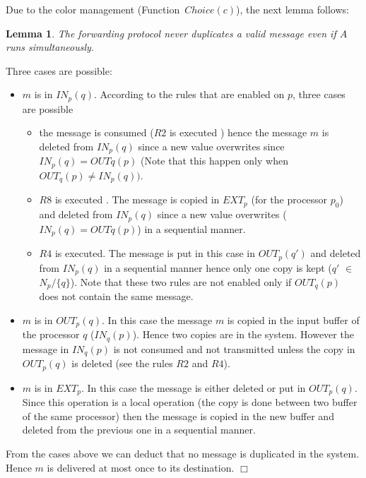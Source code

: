 \documentclass{llncs}
\renewenvironment{proof}{{\it Proof. } }{{\hfill $\Box$}\vspace{.5pc}}
\newtheorem{lem}{Lemma}
\begin{document}
Due to the color management (Function~$Choice(c)$), the next lemma follows:

\begin{lem}\label{lem:duplicate}
The forwarding protocol never duplicates a valid message even if $A$ runs simultaneously.
\end{lem}

\begin{proof}
Three cases are possible:
\begin{itemize}
\item{$m$ is in $IN_{p}(q)$. According to the rules that are enabled on $p$, three cases are possible \\ } 
\begin{itemize}
\item{the message is consumed ($R2$ is executed ) hence the message $m$ is deleted from $IN_{p}(q)$ since a new value overwrites since $IN_{p}(q)=OUT{q}(p)$ (Note that this happen only when $OUT_{q}(p)\ne IN_{p}(q))$.}
\item{$R8$ is executed . The message is copied in $EXT_{p}$ (for the processor $p_0$) and deleted from $IN_{p}(q)$ since a new value overwrites ($IN_{p}(q)=OUT{q}(p)$) in a sequential manner.}
\item{$R4$ is executed. The message is put in this case in $OUT_{p}(q')$ and deleted from $IN_{p}(q)$ in a sequential manner hence only one copy is kept ($q'$ $\in$ $N_{p}/\{q\}$). Note that these two rules are not enabled only if $OUT_{q}(p)$ does not contain the same message.}
\end{itemize}
\item{$m$ is in $OUT_{p}(q)$. In this case the message $m$ is copied in the input buffer of the processor $q$ ($IN_{q}(p)$). Hence two copies are in the system. However the message in $IN_{q}(p)$ is not consumed and not transmitted unless the copy in $OUT_{p}(q)$ is deleted (see the rules $R2$ and $R4$). } 
\item{$m$ is in $EXT_{p}$. In this case the message is either deleted or put in $OUT_{p}(q)$. Since this operation is a local operation (the copy is done between two buffer of the same processor) then the message is copied in the new buffer and deleted from the previous one in a sequential manner.}
\end{itemize}

From the cases above we can deduct that no message is duplicated in the system. Hence $m$ is delivered at most once to its destination.
\end{proof}
\end{document}
